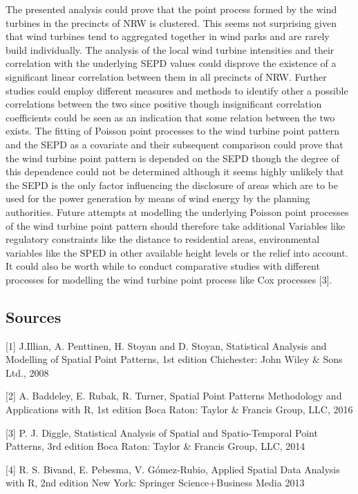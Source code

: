 \documentclass[
]{article}
\begin{document}
The presented analysis could prove that the point process formed by the
wind turbines in the precincts of NRW is clustered. This seems not
surprising given that wind turbines tend to aggregated together in wind
parks and are rarely build individually. The analysis of the local wind
turbine intensities and their correlation with the underlying SEPD
values could disprove the existence of a significant linear correlation
between them in all precincts of NRW. Further studies could employ
different measures and methods to identify other a possible correlations
between the two since positive though insignificant correlation
coefficients could be seen as an indication that some relation between
the two exists. The fitting of Poisson point processes to the wind
turbine point pattern and the SEPD as a covariate and their subsequent
comparison could prove that the wind turbine point pattern is depended
on the SEPD though the degree of this dependence could not be determined
although it seems highly unlikely that the SEPD is the only factor
influencing the disclosure of areas which are to be used for the power
generation by means of wind energy by the planning authorities. Future
attempts at modelling the underlying Poisson point processes of the wind
turbine point pattern should therefore take additional Variables like
regulatory constraints like the distance to residential areas,
environmental variables like the SPED in other available height levels
or the relief into account. It could also be worth while to conduct
comparative studies with different processes for modelling the wind
turbine point process like Cox processes {[}3{]}.

\hypertarget{sources}{%
\subsection{Sources}\label{sources}}

{[}1{]} J.Illian, A. Penttinen, H. Stoyan and D. Stoyan, Statistical
Analysis and Modelling of Spatial Point Patterns, 1st edition
Chichester: John Wiley \& Sons Ltd., 2008

{[}2{]} A. Baddeley, E. Rubak, R. Turner, Spatial Point Patterns
Methodology and Applications with R, 1st edition Boca Raton: Taylor \&
Francis Group, LLC, 2016

{[}3{]} P. J. Diggle, Statistical Analysis of Spatial and
Spatio-Temporal Point Patterns, 3rd edition Boca Raton: Taylor \&
Francis Group, LLC, 2014

{[}4{]} R. S. Bivand, E. Pebesma, V. Gómez-Rubio, Applied Spatial Data
Analysis with R, 2nd edition New York: Springer Science+Business Media
2013
\end{document}
